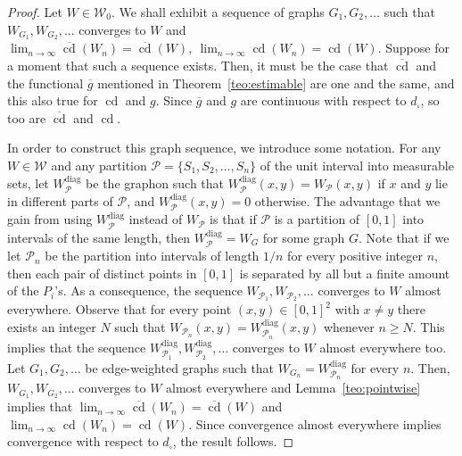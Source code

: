 \documentclass{article}
\begin{document}
\begin{proof}
    Let $W\in\mathcal{W}_0$. We shall exhibit a sequence of graphs $G_1,G_2,\dots$ such that $W_{G_1},W_{G_2},\dots$ converges to $W$ and $\lim_{n\rightarrow\infty}\overline{\mathop{\mathrm{cd}}}(W_n)=\overline{\mathop{\mathrm{cd}}}(W),\ \lim_{n\rightarrow\infty}\mathop{\mathrm{cd}}(W_n)=\mathop{\mathrm{cd}}(W)$. Suppose for a moment that such a sequence exists. Then, it must be the case that $\overline{\mathop{\mathrm{cd}}}$ and the functional $\overline{g}$ mentioned in Theorem~\ref{teo:estimable} are one and the same, and this also true for $\mathop{\mathrm{cd}}$ and $g$. Since $\overline{g}$ and $g$ are continuous with respect to $d_\square$, so too are $\overline{\mathop{\mathrm{cd}}}$ and $\mathop{\mathrm{cd}}$. 
    
    In order to construct this graph sequence, we introduce some notation. For any $W\in\mathcal{W}$ and any partition $\mathcal{P}=\{S_1,S_2,\dots,S_n\}$ of the unit interval into measurable sets, let $W_\mathcal{P}^{\text{diag}}$ be the graphon such that $W_\mathcal{P}^{\text{diag}}(x,y)=W_\mathcal{P}(x,y)$ if $x$ and $y$ lie in different parts of $\mathcal{P}$, and $W_\mathcal{P}^{\text{diag}}(x,y)=0$ otherwise. The advantage that we gain from using $W_\mathcal{P}^{\text{diag}}$ instead of $W_\mathcal{P}$ is that if $\mathcal{P}$ is a partition of $[0,1]$ into intervals of the same length, then $W_\mathcal{P}^{\text{diag}}=W_G$ for some graph $G$. Note that if we let $\mathcal{P}_n$ be the partition into intervals of length $1/n$ for every positive integer $n$, then each pair of distinct points in $[0,1]$ is separated by all but a finite amount of the $P_i$'s. As a consequence, the sequence $W_{\mathcal{P}_1},W_{\mathcal{P}_2},\dots$ converges to $W$ almost everywhere. Observe that for every point $(x,y)\in[0,1]^2$ with $x\neq y$ there exists an integer $N$ such that $W_{\mathcal{P}_n}(x,y)=W_{\mathcal{P}_n}^{\text{diag}}(x,y)$ whenever $n\geq N$. This implies that the sequence $W_{\mathcal{P}_1}^\text{diag},W_{\mathcal{P}_2}^\text{diag},\dots$ converges to $W$ almost everywhere too. Let $G_1,G_2,\dots$ be edge-weighted graphs such that $W_{G_n}=W_{\mathcal{P}_n}^\text{diag}$ for every $n$. Then, $W_{G_1},W_{G_2},\dots$ converges to $W$ almost everywhere and Lemma~\ref{teo:pointwise} implies that $\lim_{n\rightarrow\infty}\overline{\mathop{\mathrm{cd}}}(W_n)=\overline{\mathop{\mathrm{cd}}}(W)$ and $\lim_{n\rightarrow\infty}\mathop{\mathrm{cd}}(W_n)=\mathop{\mathrm{cd}}(W)$. Since convergence almost everywhere implies convergence with respect to $d_\square$, the result follows.
\end{proof}
\end{document}
